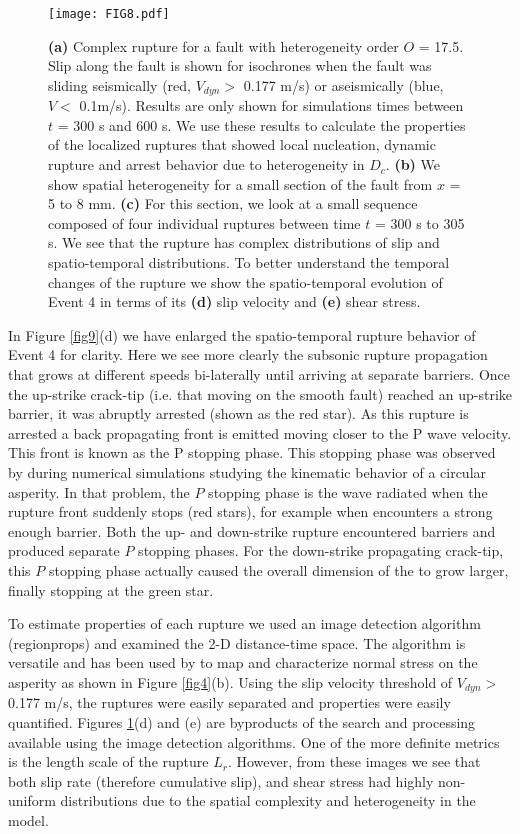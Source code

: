 \documentclass[draft]{agujournal2019}
\begin{document}
\begin{figure}
	\centering
	\texttt{[image: FIG8.pdf]} 
	\caption{\textbf{(a)} Complex rupture for a fault with heterogeneity order $O$ = 17.5. Slip along the fault is shown for isochrones when the fault was sliding seismically (red, $V_{dyn}>$ 0.177 m/s) or aseismically (blue, $V <$ 0.1m/s).  Results are only shown for simulations times between $t$ = 300 s and 600 s. We use these results to calculate the properties of the localized ruptures that showed local nucleation, dynamic rupture and arrest behavior due to heterogeneity in $D_{c}$. \textbf{(b)} We show spatial heterogeneity for a small section of the fault from $x$ = 5 to 8 mm. \textbf{(c)} For this section, we look at a small sequence composed of four individual ruptures between time $t$ = 300 s to 305 s.  We see that the rupture has complex distributions of slip and spatio-temporal distributions. To better understand the temporal changes of the rupture we show the spatio-temporal evolution of Event 4 in terms of its \textbf{(d)} slip velocity and \textbf{(e)} shear stress.}
	\label{fig8}
\end{figure}

In Figure \ref{fig9}(d) we have enlarged the spatio-temporal rupture behavior of Event 4 for clarity.  Here we see more clearly the subsonic rupture propagation that grows at different speeds bi-laterally until arriving at separate barriers. Once the up-strike crack-tip (i.e. that moving on the smooth fault) reached an up-strike barrier, it was abruptly arrested (shown as the red star).  As this rupture is arrested a back propagating front is emitted moving closer to the P wave velocity.  This front is known as the P stopping phase.  This stopping phase was observed by  during numerical simulations studying the kinematic behavior of a circular asperity.  In that problem, the $P$ stopping phase is the wave radiated when the rupture front suddenly stops (red stars), for example when encounters a strong enough barrier.  Both the up- and down-strike rupture encountered barriers and produced separate $P$ stopping phases.  For the down-strike propagating crack-tip, this $P$ stopping phase actually caused the overall dimension of the to grow larger, finally stopping at the green star. 

To estimate properties of each rupture we used an image detection algorithm (regionprops) and examined the 2-D distance-time space. The algorithm is versatile and has been used by  to map and characterize normal stress on the asperity as shown in Figure \ref{fig4}(b).  Using the slip velocity threshold of $V_{dyn}>$ 0.177 m/s, the ruptures were easily separated and properties were easily quantified.  Figures \ref{fig8}(d) and (e) are byproducts of the search and processing available using the image detection algorithms.  One of the more definite metrics is the length scale of the rupture $L_{r}$. However, from these images we see that both slip rate (therefore cumulative slip), and shear stress had highly non-uniform distributions due to the spatial complexity and heterogeneity in the model. 
\end{document}
